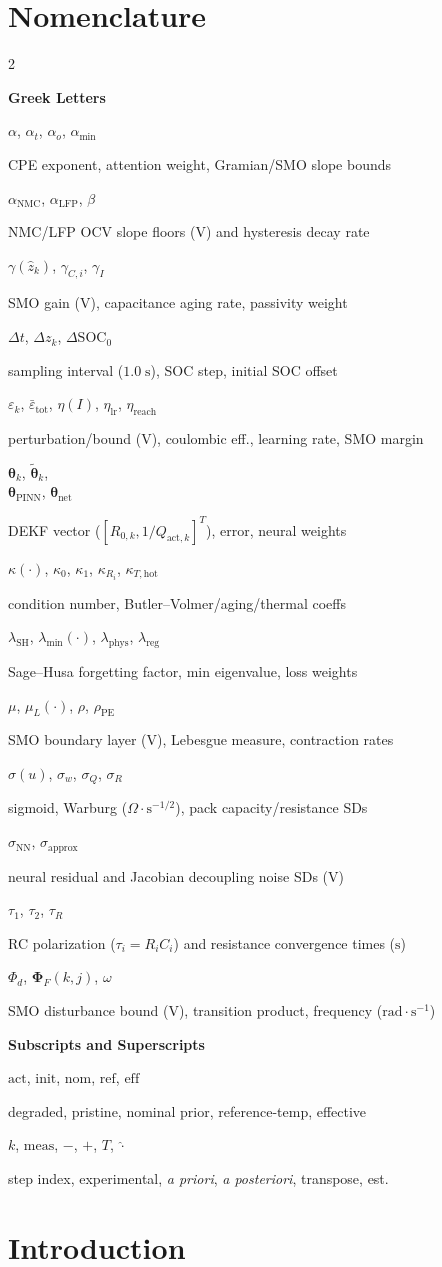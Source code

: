 \documentclass[10pt,a4paper]{article}
\newcommand{\entry}[2]{\noindent\parbox[t]{0.30\columnwidth}{\raggedright #1}\hfill\parbox[t]{0.66\columnwidth}{\raggedright #2}\par\vspace{2pt}}
\newcommand{\EntryHeading}[1]{\par\vspace{5pt}\noindent\textbf{\small #1}\par\vspace{2pt}}
\newenvironment{nomenclature}{\section*{Nomenclature}\begin{multicols}{2}\footnotesize}{\end{multicols}\vspace{0.4em}}
\begin{document}
\begin{nomenclature}
\EntryHeading{Greek Letters}
\entry{$\alpha$, $\alpha_t$, $\alpha_o$, $\alpha_{\min}$}{CPE exponent, attention weight, Gramian/SMO slope bounds}
\entry{$\alpha_{\text{NMC}}$, $\alpha_{\text{LFP}}$, $\beta$}{NMC/LFP OCV slope floors ($\text{V}$) and hysteresis decay rate}
\entry{$\gamma(\hat{z}_k)$, $\gamma_{C,i}$, $\gamma_I$}{SMO gain ($\text{V}$), capacitance aging rate, passivity weight}
\entry{$\Delta t$, $\Delta z_k$, $\Delta\text{SOC}_0$}{sampling interval ($1.0\;\text{s}$), SOC step, initial SOC offset}
\entry{$\varepsilon_k$, $\bar{\varepsilon}_{\text{tot}}$, $\eta(I)$, $\eta_{\text{lr}}$, $\eta_{\text{reach}}$}{perturbation/bound ($\text{V}$), coulombic eff., learning rate, SMO margin}
\entry{$\boldsymbol{\theta}_k$, $\tilde{\boldsymbol{\theta}}_k$,\\ $\boldsymbol{\theta}_{\text{PINN}}$, $\boldsymbol{\theta}_{\text{net}}$}{DEKF vector ($[R_{0,k}, 1/Q_{\text{act},k}]^T$), error, neural weights}
\entry{$\kappa(\cdot)$, $\kappa_0$, $\kappa_1$, $\kappa_{R_i}$, $\kappa_{T,\text{hot}}$}{condition number, Butler--Volmer/aging/thermal coeffs}
\entry{$\lambda_{\text{SH}}$, $\lambda_{\min}(\cdot)$, $\lambda_{\text{phys}}$, $\lambda_{\text{reg}}$}{Sage--Husa forgetting factor, min eigenvalue, loss weights}
\entry{$\mu$, $\mu_L(\cdot)$, $\rho$, $\rho_{\text{PE}}$}{SMO boundary layer ($\text{V}$), Lebesgue measure, contraction rates}
\entry{$\sigma(u)$, $\sigma_w$, $\sigma_Q$, $\sigma_R$}{sigmoid, Warburg ($\Omega\cdot\text{s}^{-1/2}$), pack capacity/resistance SDs}
\entry{$\sigma_{\text{NN}}$, $\sigma_{\text{approx}}$}{neural residual and Jacobian decoupling noise SDs ($\text{V}$)}
\entry{$\tau_1$, $\tau_2$, $\tau_R$}{RC polarization ($\tau_i = R_i C_i$) and resistance convergence times ($\text{s}$)}
\entry{$\Phi_d$, $\boldsymbol{\Phi}_F(k,j)$, $\omega$}{SMO disturbance bound ($\text{V}$), transition product, frequency ($\text{rad}\cdot\text{s}^{-1}$)}

\EntryHeading{Subscripts and Superscripts}
\entry{$\text{act}$, $\text{init}$, $\text{nom}$, $\text{ref}$, $\text{eff}$}{degraded, pristine, nominal prior, reference-temp, effective}
\entry{$k$, $\text{meas}$, $-$, $+$, $T$, $\hat{\cdot}$}{step index, experimental, \emph{a priori}, \emph{a posteriori}, transpose, est.}
\end{nomenclature}

\section{Introduction}
\end{document}
